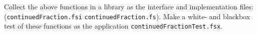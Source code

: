Collect the above functions in a library as the interface and
implementation files:
(\lstinline[language=console]{continuedFraction.fsi}
\lstinline[language=console]{continuedFraction.fs}). Make a white- and
blackbox test of these functions as the application \lstinline[language=console]{continuedFractionTest.fsx}.
